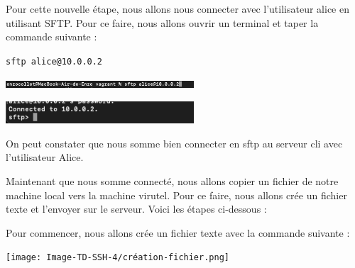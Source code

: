 \documentclass[12pt]{article}
\begin{document}
\vspace{0.3cm}

Pour cette nouvelle étape, nous allons nous connecter avec l'utilisateur alice en utilisant SFTP. Pour ce faire, nous allons ouvrir un terminal et taper la commande suivante : 

\texttt{sftp alice@10.0.0.2}

\vspace{0.3cm}

\begin{center}
  \includegraphics[width=7cm]{Image-TD-SSH-4/commande-sftp.png}
\end{center}

\vspace{0.3cm}

\begin{center}
  \includegraphics[width=7cm]{Image-TD-SSH-4/connexion-sftp.png}
\end{center}

\vspace{0.3cm}

On peut constater que nous somme bien connecter en sftp au serveur cli avec l'utilisateur Alice.

\vspace{0.3cm}

Maintenant que nous somme connecté, nous allons copier un fichier de notre machine local vers la machine virutel. Pour ce faire, nous allons crée un fichier texte et l'envoyer sur le serveur. Voici les étapes ci-dessous : 

\vspace{0.3cm}

Pour commencer, nous allons crée un fichier texte avec la commande suivante  : 

\vspace{0.3cm}

\begin{center}
  \texttt{[image: Image-TD-SSH-4/création-fichier.png]}
\end{center}

\vspace{0.3cm}

\newpage

\vspace{0.3cm}
\end{document}
